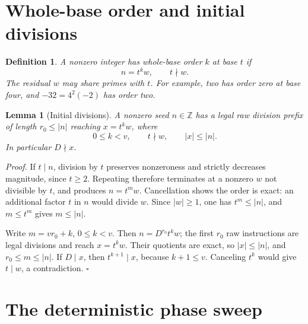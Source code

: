 \documentclass[11pt,letterpaper]{article}
\newcommand{\Z}{\mathbb{Z}}
\newtheorem{lemma}[theorem]{Lemma}
\newtheorem{definition}[theorem]{Definition}
\newenvironment{proof}{\noindent\textit{Proof.}}{\hfill\(\square\)}
\begin{document}
\section{Whole-base order and initial divisions}

\begin{definition}
A nonzero integer has whole-base order \(k\) at base \(t\) if
\[
n=t^k w,\qquad t\nmid w.
\]
The residual \(w\) may share primes with \(t\). For example, two has order zero
at base four, and \(-32=4^2(-2)\) has order two.
\end{definition}

\begin{lemma}[Initial divisions]\label{Normalize}
A nonzero seed \(n\in\Z\) has a legal raw division prefix of length
\(r_0\le |n|\) reaching \(x=t^k w\), where
\[
0\le k<v,\qquad t\nmid w,\qquad |x|\le|n|.
\]
In particular \(D\nmid x\).
\end{lemma}
\begin{proof}
If \(t\mid n\), division by \(t\) preserves nonzeroness and strictly decreases
magnitude, since \(t\ge2\). Repeating therefore terminates at a nonzero \(w\)
not divisible by \(t\), and produces \(n=t^m w\). Cancellation shows the
order is exact: an additional factor \(t\) in \(n\) would divide \(w\).
Since \(|w|\ge1\), one has \(t^m\le|n|\), and \(m\le t^m\) gives
\(m\le|n|\).

Write \(m=vr_0+k\), \(0\le k<v\). Then
\(n=D^{r_0}t^k w\); the first \(r_0\) raw instructions are legal divisions and
reach \(x=t^k w\). Their quotients are exact, so \(|x|\le|n|\), and
\(r_0\le m\le|n|\). If \(D\mid x\), then \(t^{k+1}\mid x\), because
\(k+1\le v\). Canceling \(t^k\) would give \(t\mid w\), a contradiction.
\end{proof}

\section{The deterministic phase sweep}
\end{document}
